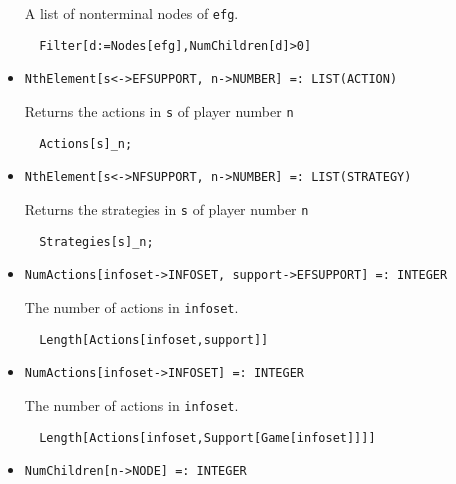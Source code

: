 \begin{itemize}
\bd 
A list of nonterminal nodes of \verb+efg+.
\begin{verbatim}
  Filter[d:=Nodes[efg],NumChildren[d]>0]
\end{verbatim} 
\ed

\item{}
\protect \large \begin{verbatim}
NthElement[s<->EFSUPPORT, n->NUMBER] =: LIST(ACTION) 
\end{verbatim}\normalsize

\bd 
Returns the actions in \verb+s+ of player number \verb+n+
\begin{verbatim}
  Actions[s]_n;
\end{verbatim} 
\ed

\item{}
\protect \large \begin{verbatim}
NthElement[s<->NFSUPPORT, n->NUMBER] =: LIST(STRATEGY) 
\end{verbatim}\normalsize

\bd 
Returns the strategies in \verb+s+ of player number \verb+n+
\begin{verbatim}
  Strategies[s]_n;
\end{verbatim} 
\ed

\item{}
\protect \large \begin{verbatim}
NumActions[infoset->INFOSET, support->EFSUPPORT] =: INTEGER 
\end{verbatim}\normalsize

\bd 
The number of actions in \verb+infoset+.
\begin{verbatim}
  Length[Actions[infoset,support]] 
\end{verbatim} 
\ed

\item{}
\protect \large \begin{verbatim}
NumActions[infoset->INFOSET] =: INTEGER 
\end{verbatim}\normalsize

\bd 
The number of actions in  \verb+infoset+.
\begin{verbatim}
  Length[Actions[infoset,Support[Game[infoset]]]] 
\end{verbatim} 
\ed

\item{}
\protect \large \begin{verbatim}
NumChildren[n->NODE] =: INTEGER 
\end{verbatim}\normalsize


\end{itemize}
